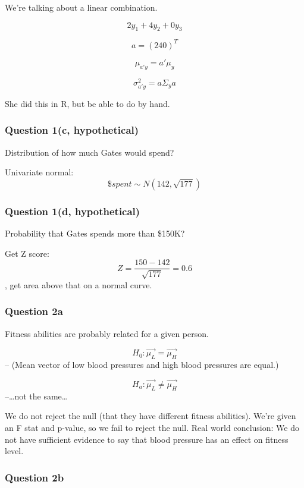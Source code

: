 We're talking about a linear combination.

\[2y_1 + 4y_2 + 0y_3\]

\[a = (2 4 0)^T\]

\[\mu_{a'y} = a'\mu_y\]

\[\sigma_{a'y}^2 = a\Sigma_ya\]

She did this in R, but be able to do by hand.

\hypertarget{question-1c-hypothetical}{%
\subsubsection{Question 1(c,
hypothetical)}\label{question-1c-hypothetical}}

Distribution of how much Gates would spend?

Univariate normal: \[ \$ spent \sim N(142, \sqrt{177}) \]

\hypertarget{question-1d-hypothetical}{%
\subsubsection{Question 1(d,
hypothetical)}\label{question-1d-hypothetical}}

Probability that Gates spends more than \$150K?

Get Z score: \[Z = \frac{150-142}{\sqrt{177}}=0.6 \], get area above
that on a normal curve.

\hypertarget{question-2a}{%
\subsubsection{Question 2a}\label{question-2a}}

Fitness abilities are probably related for a given person.

\[H_0: \vec{\mu_L} = \vec{\mu_H}\] -- (Mean vector of low blood
pressures and high blood pressures are equal.)

\[H_a: \vec{\mu_L} \ne \vec{\mu_H}\] --\ldots{}not the same\ldots{}

We do not reject the null (that they have different fitness abilities).
We're given an F stat and p-value, so we fail to reject the null. Real
world conclusion: We do not have sufficient evidence to say that blood
pressure has an effect on fitness level.

\hypertarget{question-2b}{%
\subsubsection{Question 2b}\label{question-2b}}

